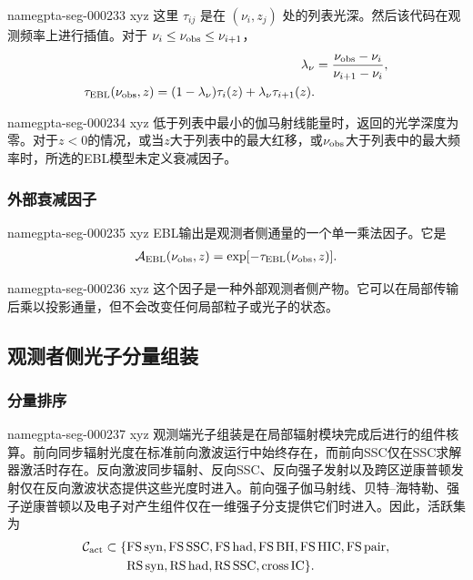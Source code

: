 \documentclass[twocolumn]{aastex702}
\makeatletter
\providecommand{\gptareaderanchor}[1]{\pdfdest name{#1} xyz}%
\providecommand{\gptareaderanchor}[1]{\special{pdf:dest (#1) [ @thispage /XYZ @xpos @ypos null ]}}%
\makeatother
\begin{document}
\gptareaderanchor{gpta-seg-000233}%
这里 \(\tau_{ij}\) 是在 \((\nu_i,z_j)\) 处的列表光深。然后该代码在观测频率上进行插值。对于 \(\nu_i\le\nu_{\rm obs}\le\nu_{i+1}\)，
\begin{equation}
\begin{aligned}
\lambda_\nu&=\frac{\nu_{\rm obs}-\nu_i}{\nu_{i+1}-\nu_i},\\
\tau_{\rm EBL}(\nu_{\rm obs},z)=
(1-\lambda_\nu)\tau_i(z)+\lambda_\nu\tau_{i+1}(z).
\end{aligned}
\end{equation}

\gptareaderanchor{gpta-seg-000234}%
低于列表中最小的伽马射线能量时，返回的光学深度为零。对于\(z<0\)的情况，或当\(z\)大于列表中的最大红移，或\(\nu_{\rm obs}\)大于列表中的最大频率时，所选的EBL模型未定义衰减因子。

\subsubsection{外部衰减因子}


\gptareaderanchor{gpta-seg-000235}%
EBL输出是观测者侧通量的一个单一乘法因子。它是
\begin{equation}
\begin{aligned}
\mathcal{A}_{\rm EBL}(\nu_{\rm obs},z)
=\exp[-\tau_{\rm EBL}(\nu_{\rm obs},z)].
\end{aligned}
\end{equation}

\gptareaderanchor{gpta-seg-000236}%
这个因子是一种外部观测者侧产物。它可以在局部传输后乘以投影通量，但不会改变任何局部粒子或光子的状态。

\subsection{观测者侧光子分量组装}

\subsubsection{分量排序}


\gptareaderanchor{gpta-seg-000237}%
观测端光子组装是在局部辐射模块完成后进行的组件核算。前向同步辐射光度在标准前向激波运行中始终存在，而前向SSC仅在SSC求解器激活时存在。反向激波同步辐射、反向SSC、反向强子发射以及跨区逆康普顿发射仅在反向激波状态提供这些光度时进入。前向强子伽马射线、贝特--海特勒、强子逆康普顿以及电子对产生组件仅在一维强子分支提供它们时进入。因此，活跃集为
\begin{equation}
\begin{aligned}
{\cal C}_{\rm act}\subset
\{&{\rm FS\,syn},{\rm FS\,SSC},{\rm FS\,had},{\rm FS\,BH},
{\rm FS\,HIC},{\rm FS\,pair},\\
&{\rm RS\,syn},{\rm RS\,had},{\rm RS\,SSC},{\rm cross\,IC}\}.
\end{aligned}
\end{equation}
\end{document}
